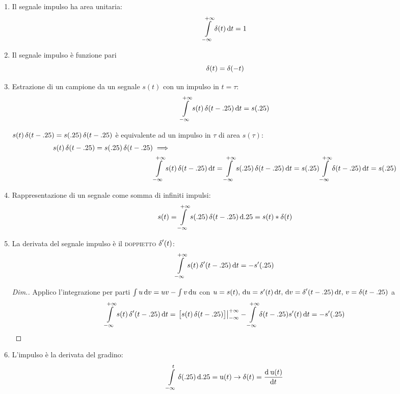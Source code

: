 \begin{enumerate}
	\item Il segnale impulso ha area unitaria:
	\begin{equation}
	\intinf{\impulse(t)}{t}=1
	\end{equation}
	\item Il segnale impulso è funzione pari 
	\begin{equation}
	\impulse(t)=\impulse(-t)
	\end{equation}
	\item Estrazione di un campione da un segnale $s(t)$ con un impulso in $t=\tau$:
	\begin{equation}
	\intinf{s(t)\impulse(t-\tau)}{t}=s(\tau)
	\end{equation}
	
	$s(t)\impulse(t-\tau)=s(\tau)\impulse(t-\tau)$ è equivalente ad un impulso in $\tau$ di area $s(\tau)$:
	\begin{align*}
	s(t)\impulse(t-\tau)=s(\tau)\impulse(t-\tau) &\implies \\ 
	& \intinf{s(t)\impulse(t-\tau)}{t} =\intinf{s(\tau)\impulse(t-\tau)}{t} = s(\tau)\intinf{\impulse(t-\tau)}{t} = s(\tau)
	\end{align*}
	
	\item Rappresentazione di un segnale come somma di infiniti impulsi:
	\begin{equation}
	s(t)=\intinf{s(\tau)\impulse(t-\tau)}{\tau}=s(t)\ast\impulse(t)
	\end{equation}
	
	\item La derivata del segnale impulso è il \textsc{doppietto} $\impulse'(t)$:
	\begin{equation}
	\intinf{s(t)\impulse'(t-\tau)}{t}=-s'(\tau)
	\end{equation}
	
	\begin{proof}[Dim.]
		Applico l'integrazione per parti $\int{u\diff v}=u v-\int{v\diff u}$ con $u=s(t) ,\, \diff u=s'(t)\diff t ,\, \diff v=\impulse'(t-\tau)\diff t ,\, v=\impulse(t-\tau)$  a 
		\[\intinf{s(t)\impulse'(t-\tau)}{t}= \restrict{\bigl[ s(t)\impulse(t-\tau)\bigr]}{-\infty}^{+\infty} -\intinf{\impulse(t-\tau)s'(t)}{t}=-s'(\tau)\]
	\end{proof}
	\item L'impulso è la derivata del gradino:
	\begin{equation}
	\intd{-\infty}{t}{\impulse(\tau)}{\tau}=\step(t) \to \impulse(t)=\deriv{\step(t)}{t}
	\end{equation}
	

\end{enumerate}

